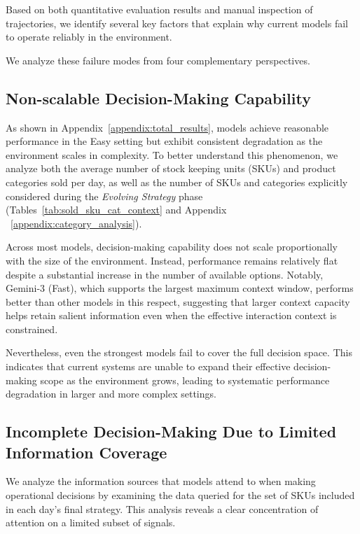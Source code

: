 
Based on both quantitative evaluation results and manual inspection of trajectories, we identify several key factors that explain why current models fail to operate reliably in the environment.

We analyze these failure modes from four complementary perspectives.

\subsection{Non-scalable Decision-Making Capability}




As shown in Appendix~\ref{appendix:total_results}, models achieve reasonable performance in the Easy setting but exhibit consistent degradation as the environment scales in complexity. To better understand this phenomenon, we analyze both the average number of stock keeping units (SKUs) and product categories sold per day, as well as the number of SKUs and categories explicitly considered during the \emph{Evolving Strategy} phase (Tables~\ref{tab:sold_sku_cat_context} and Appendix ~\ref{appendix:category_analysis}).

Across most models, decision-making capability does not scale proportionally with the size of the environment. Instead, performance remains relatively flat despite a substantial increase in the number of available options. Notably, Gemini-3 (Fast), which supports the largest maximum context window, performs better than other models in this respect, suggesting that larger context capacity helps retain salient information even when the effective interaction context is constrained.

Nevertheless, even the strongest models fail to cover the full decision space. This indicates that current systems are unable to expand their effective decision-making scope as the environment grows, leading to systematic performance degradation in larger and more complex settings.

\subsection{Incomplete Decision-Making Due to Limited Information Coverage}



We analyze the information sources that models attend to when making operational decisions by examining the data queried for the set of SKUs included in each day’s final strategy. This analysis reveals a clear concentration of attention on a limited subset of signals.

